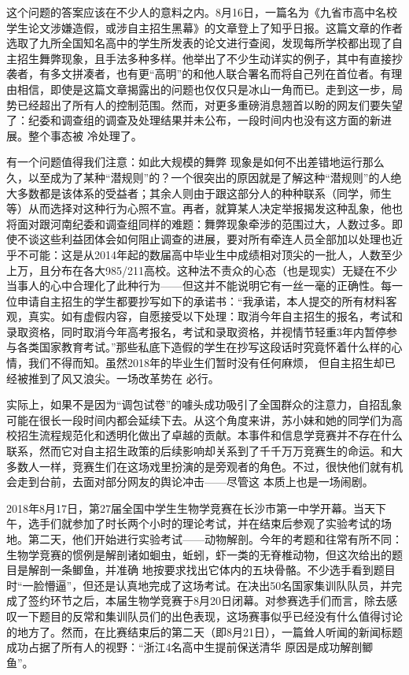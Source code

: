 \documentclass{article}
\begin{document}
这个问题的答案应该在不少⼈的意料之内。8⽉16⽇，⼀篇名为《九省市⾼中名校学⽣论⽂涉嫌造假，或涉⾃主招⽣⿊幕》的⽂章登上了知乎⽇报。这篇⽂章的作者选取了九所全国知名⾼中的学⽣所发表的论⽂进⾏查阅，发现每所学校都出现了⾃主招⽣舞弊现象，且⼿法多种多样。他举出了不少⽣动详实的例⼦，其中有直接抄袭者，有多⽂拼凑者，也有更“⾼明”的和他⼈联合署名⽽将⾃⼰列在⾸位者。有理由相信，即使是这篇⽂章揭露出的问题也仅仅只是冰⼭⼀⾓⽽已。⾛到这⼀步，局势已经超出了所有⼈的控制范围。然⽽，对更多重磅消息翘⾸以盼的⽹友们要失望了：纪委和调查组的调查及处理结果并未公布，⼀段时间内也没有这⽅⾯的新进展。整个事态被
冷处理了。 

有⼀个问题值得我们注意：如此⼤规模的舞弊
\newpage
现象是如何不出差错地运⾏那么久，以⾄成为了某种“潜规则”的？⼀个很突出的原因就是了解这种“潜规则”的⼈绝⼤多数都是该体系的受益者；其余⼈则由于跟这部分⼈的种种联系（同学，师⽣等）从⽽选择对这种⾏为⼼照不宣。再者，就算某⼈决定举报揭发这种乱象，他也将⾯对跟河南纪委和调查组同样的难题：舞弊现象牵涉的范围过⼤，⼈数过多。即使不谈这些利益团体会如何阻⽌调查的进展，要对所有牵连⼈员全部加以处理也近乎不可能：这是从2014年起的数届⾼中毕业⽣中成绩相对顶尖的⼀批⼈，⼈数⾄少上万，且分布在各⼤985/211⾼校。这种法不责众的⼼态（也是现实）⽆疑在不少当事⼈的⼼中合理化了此种⾏为——但这并不能说明它有⼀丝⼀毫的正确性。每⼀位申请⾃主招⽣的学⽣都要抄写如下的承诺书：“我承诺，本⼈提交的所有材料客观，真实。如有虚假内容，⾃愿接受以下处理：取消今年⾃主招⽣的报名，考试和录取资格，同时取消今年⾼考报名，考试和录取资格，并视情节轻重3年内暂停参与各类国家教育考试。”那些私底下造假的学⽣在抄写这段话时究竟怀着什么样的⼼情，我们不得⽽知。虽然2018年的毕业⽣们暂时没有任何⿇烦，
\newpage
但⾃主招⽣却已经被推到了风⼜浪尖。⼀场改⾰势在
必⾏。 

实际上，如果不是因为“调包试卷”的噱头成功吸引了全国群众的注意⼒，⾃招乱象可能在很长⼀段时间内都会延续下去。从这个⾓度来讲，苏⼩妹和她的同学们为⾼校招⽣流程规范化和透明化做出了卓越的贡献。本事件和信息学竞赛并不存在什么联系，然⽽它对⾃主招⽣政策的后续影响却关系到了千千万万竞赛⽣的命运。和⼤多数⼈⼀样，竞赛⽣们在这场戏⾥扮演的是旁观者的⾓⾊。不过，很快他们就有机会⾛到台前，去⾯对部分⽹友的舆论冲击——尽管这
本质上也是⼀场闹剧。 

2018年8⽉17⽇，第27届全国中学⽣⽣物学竞赛在长沙市第⼀中学开幕。当天下午，选⼿们就参加了时长两个⼩时的理论考试，并在结束后参观了实验考试的场地。第⼆天，他们开始进⾏实验考试——动物解剖。今年的考题和往常有所不同：⽣物学竞赛的惯例是解剖诸如蛔⾍，蚯蚓，虾⼀类的⽆脊椎动物，但这次给出的题⽬是解剖⼀条鲫鱼，并准确
\newpage
地按要求找出它体内的五块⾻骼。不少选⼿看到题⽬时“⼀脸懵逼”，但还是认真地完成了这场考试。在决出50名国家集训队队员，并完成了签约环节之后，本届⽣物学竞赛于8⽉20⽇闭幕。对参赛选⼿们⽽⾔，除去感叹⼀下题⽬的反常和集训队员们的出⾊表现，这场赛事似乎已经没有什么值得讨论的地⽅了。然⽽，在⽐赛结束后的第⼆天（即8⽉21⽇），⼀篇耸⼈听闻的新闻标题成功占据了所有⼈的视野：“浙江4名⾼中⽣提前保送清华 原因是成功解剖鲫
鱼”。 
\end{document}
